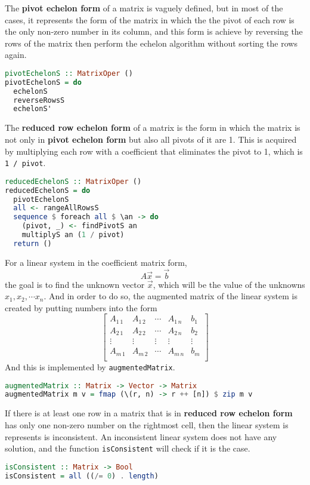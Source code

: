 \documentclass[12pt,a4paper]{article}
\begin{document}
The \textbf{pivot echelon form} of a matrix is vaguely defined, but in most of the cases, it represents the form of the matrix in which the the pivot of each row is the only non-zero number in its column, and this form is achieve by reversing the rows of the matrix then perform the echelon algorithm without sorting the rows again.
\begin{lstlisting}[language=Haskell]
pivotEchelonS :: MatrixOper ()
pivotEchelonS = do
  echelonS
  reverseRowsS
  echelonS'
\end{lstlisting}

The \textbf{reduced row echelon form} of a matrix is the form in which the matrix is not only in \textbf{pivot echelon form} but also all pivots of it are 1. This is acquired by multiplying each row with a coefficient that eliminates the pivot to 1, which is \texttt{1 / pivot}.
\begin{lstlisting}[language=Haskell]
reducedEchelonS :: MatrixOper ()
reducedEchelonS = do
  pivotEchelonS
  all <- rangeAllRowsS
  sequence $ foreach all $ \an -> do
    (pivot, _) <- findPivotS an
    multiplyS an (1 / pivot)
  return ()
\end{lstlisting}

For a linear system in the coefficient matrix form,
$$
A\overrightarrow{x}=\overrightarrow{b}
$$
the goal is to find the unknown vector $\overrightarrow{x}$, which will be the value of the unknowns $x_1, x_2, \cdots x_n$. And in order to do so, the augmented matrix of the linear system is created by putting numbers into the form
$$
\left[
\begin{array}{cccc|c}
A_{1\,1} & A_{1\,2} & \cdots & A_{1\,n} & b_1 \\
A_{2\,1} & A_{2\,2} & \cdots & A_{2\,n} & b_2 \\
\vdots & \vdots & \vdots & \vdots & \vdots \\
A_{m\,1} & A_{m\,2} & \cdots & A_{m\,n} & b_m \\
\end{array}
\right]
$$
And this is implemented by \texttt{augmentedMatrix}.
\begin{lstlisting}[language=Haskell]
augmentedMatrix :: Matrix -> Vector -> Matrix
augmentedMatrix m v = fmap (\(r, n) -> r ++ [n]) $ zip m v
\end{lstlisting}

If there is at least one row in a matrix that is in \textbf{reduced row echelon form} has only one non-zero number on the rightmost cell, then the linear system is represents is inconsistent. An inconsistent linear system does not have any solution, and the function \texttt{isConsistent} will check if it is the case.
\begin{lstlisting}[language=Haskell]
isConsistent :: Matrix -> Bool
isConsistent = all ((/= 0) . length)
\end{lstlisting}
\end{document}
